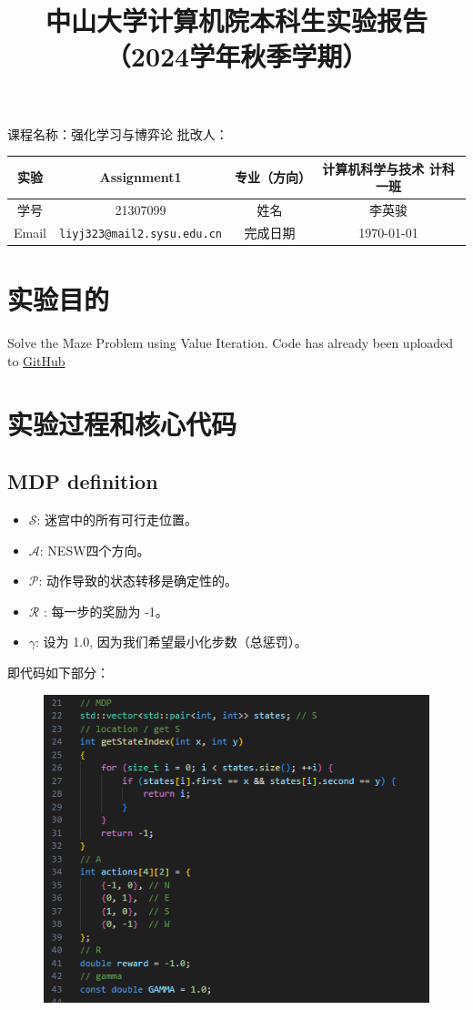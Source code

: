 \documentclass{article}
\title{中山大学计算机院本科生实验报告\\
    （2024学年秋季学期）}
\begin{document}
\maketitle
课程名称：强化学习与博弈论 \qquad\qquad\qquad\qquad\qquad\qquad
批改人：
\begin{table}[h]
    \centering
    \begin{tabular}{|c|c|c|c|} \hline
        实验    & Assignment1                 & 专业（方向） & 计算机科学与技术 计科一班 \\ \hline
        学号    & 21307099                           & 姓名     & 李英骏           \\\hline
        Email & \texttt{liyj323@mail2.sysu.edu.cn} & 完成日期   & \today        \\\hline
    \end{tabular}
\end{table}
\tableofcontents

\newpage
\section{实验目的}
Solve the Maze Problem using Value Iteration. Code has already been uploaded to \href{https://github.com/KFCCrazzzyThursday/rl_and_game_theory/blob/main/MDP.cpp}{GitHub}


\section{实验过程和核心代码}
\subsection{MDP definition}
\begin{itemize}
    \item $\mathcal{S}$: 迷宫中的所有可行走位置。
    \item $\mathcal{A}$: NESW四个方向。
    \item $\mathcal{P}$: 动作导致的状态转移是确定性的。
    \item $\mathcal{R}$ : 每一步的奖励为 -1。
    \item $\gamma$: 设为 1.0, 因为我们希望最小化步数（总惩罚）。
\end{itemize}
即代码如下部分：
\begin{figure}[H]
    \centering
    \includegraphics[width=0.7\linewidth]{./image/image4.png}
    \caption{}
\end{figure}
\end{document}
